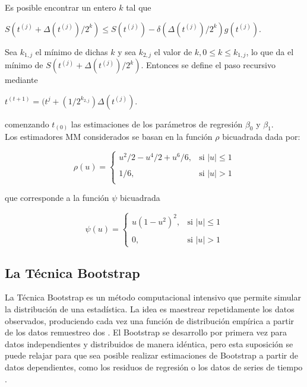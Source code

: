 Es posible encontrar un entero $k$ \parencite{yohai-1987} tal que\\

\begin{center}
	$ S(t^{(j)} + \Delta(t^{(j)} )/2^{k}) \leq S(t^{(j)}) - \delta( \Delta(t^{(j)} )/2^{k} ) g(t^{(j)})$. \\
\end{center}


Sea $k_{1,j}$ el mínimo de dichas $k$ y sea $k_{2,j}$ el valor de $k, 0 \leq k  \leq k_{1,j}$, lo que da el mínimo de $S(t^{(j)} + \Delta(t^{(j)} )/2^{k})$. Entonces se define el paso recursivo mediante\\

\begin{center}
	$ t^{(t+1)} = (t^{j} + (1/2^{k_{2,j}}) \Delta(t^{(j)} )$.\\
\end{center}

comenzando $t_{(0)} $ las estimaciones de los parámetros de regresión $\beta_{0}$ y $\beta_{1}$.\\

Los estimadores MM considerados se basan en la función $\rho$ bicuadrada dada por:


\[
\rho(u) =
\begin{cases}
	u^{2}/2 -u^{4}/2 + u^{6}/6	, & \text{si } |u| \leq 1 \\ \\
	1/6,     & \text{si } | u | > 1\\
\end{cases}
\]


que corresponde a la función $\psi$ bicuadrada

\[
\psi(u) =
\begin{cases}
	u(1- u^{2})^{2}	, & \text{si } |u| \leq 1 \\ \\
	0,     & \text{si } | u | > 1
\end{cases}
\]



\subsection{La Técnica Bootstrap}

La Técnica Bootstrap es un método computacional intensivo que permite simular la distribución de una estadística. La idea es maestrear repetidamente los datos observados, produciendo cada vez una función de distribución empírica a partir de los datos remuestreo dos \parencite{zacarias-2023}. El Bootstrap se desarrollo por primera vez para datos independientes y distribuidos de manera idéntica, pero esta suposición se puede relajar para que sea posible realizar estimaciones de Bootstrap a partir de datos dependientes, como los residuos de regresión o los datos de series de tiempo \parencite{givens-2013}.\\


